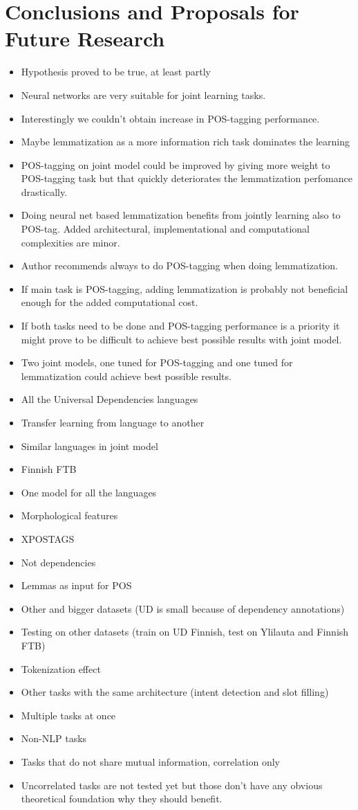 \documentclass[12pt,a4paper,english
]{tutthesis}
\begin{document}
\chapter{Conclusions and Proposals for Future Research}
\label{ch:conclusions}
\begin{itemize}
\item Hypothesis proved to be true, at least partly
\item Neural networks are very suitable for joint learning tasks.
\item Interestingly we couldn't obtain increase in POS-tagging performance.
\item Maybe lemmatization as a more information rich task dominates the learning
\item POS-tagging on joint model could be improved by giving more weight to POS-tagging task but that quickly deteriorates the lemmatization perfomance drastically.
\item Doing neural net based lemmatization benefits from jointly learning also to POS-tag. Added architectural, implementational and computational complexities are minor.
\item Author recommends always to do POS-tagging when doing lemmatization.
\item If main task is POS-tagging, adding lemmatization is probably not beneficial enough for the added computational cost.
\item If both tasks need to be done and POS-tagging performance is a priority it might prove to be difficult to achieve best possible results with joint model.
\item Two joint models, one tuned for POS-tagging and one tuned for lemmatization could achieve best possible results.
\item All the Universal Dependencies languages
\item Transfer learning from language to another
\item Similar languages in joint model
\item Finnish FTB
\item One model for all the languages
\item Morphological features
\item XPOSTAGS
\item Not dependencies
\item Lemmas as input for POS
\item Other and bigger datasets (UD is small because of dependency annotations)
\item Testing on other datasets (train on UD Finnish, test on Ylilauta and Finnish FTB)
\item Tokenization effect
\item Other tasks with the same architecture (intent detection and slot filling)
\item Multiple tasks at once
\item Non-NLP tasks
\item Tasks that do not share mutual information, correlation only
\item Uncorrelated tasks are not tested yet but those don't have any obvious theoretical foundation why they should benefit.
\end{itemize}
\end{document}
